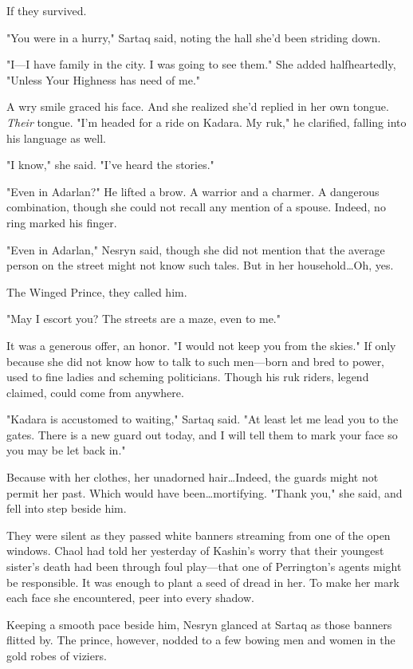 If they survived.

"You were in a hurry," Sartaq said, noting the hall she'd been striding down.

"I---I have family in the city.
I was going to see them."
She added halfheartedly, "Unless Your Highness has need of me."

A wry smile graced his face.
And she realized she'd replied in her own tongue.
\emph{Their} tongue.
"I'm headed for a ride on Kadara.
My ruk," he clarified, falling into his language as well.

"I know," she said.
"I've heard the stories."

"Even in Adarlan?"
He lifted a brow.
A warrior and a charmer.
A dangerous combination, though she could not recall any mention of a spouse.
Indeed, no ring marked his finger.

"Even in Adarlan," Nesryn said, though she did not mention that the average person on the street might not know such tales.
But in her household\ldots Oh, yes.

The Winged Prince, they called him.

"May I escort you?
The streets are a maze, even to me."

It was a generous offer, an honor.
"I would not keep you from the skies."
If only because she did not know how to talk to such men---born and bred to power, used to fine ladies and scheming politicians.
Though his ruk riders, legend claimed, could come from anywhere.

"Kadara is accustomed to waiting," Sartaq said.
"At least let me lead you to the gates.
There is a new guard out today, and I will tell them to mark your face so you may be let back in."

Because with her clothes, her unadorned hair\ldots Indeed, the guards might not permit her past.
Which would have been\ldots mortifying.
"Thank you," she said, and fell into step beside him.

They were silent as they passed white banners streaming from one of the open windows.
Chaol had told her yesterday of Kashin's worry that their youngest sister's death had been through foul play---that one of Perrington's agents might be responsible.
It was enough to plant a seed of dread in her.
To make her mark each face she encountered, peer into every shadow.

Keeping a smooth pace beside him, Nesryn glanced at Sartaq as those banners flitted by.
The prince, however, nodded to a few bowing men and women in the gold robes of viziers.

